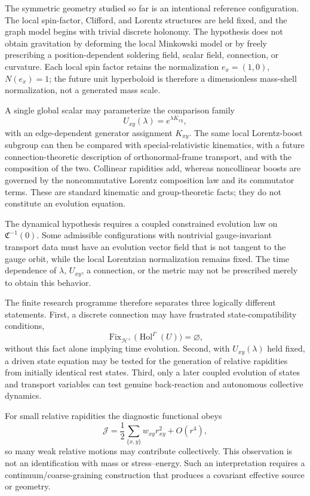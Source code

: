 \documentclass[11pt,a4paper]{article}
\theoremstyle{remark}
\newcommand{\Hol}{\operatorname{Hol}}
\begin{document}
The symmetric geometry studied so far is an intentional reference configuration.  The local spin-factor, Clifford, and Lorentz structures are held fixed, and the graph model begins with trivial discrete holonomy.  The hypothesis does not obtain gravitation by deforming the local Minkowski model or by freely prescribing a position-dependent soldering field, scalar field, connection, or curvature.  Each local spin factor retains the normalization \(e_x=(1,0)\), \(N(e_x)=1\); the future unit hyperboloid is therefore a dimensionless mass-shell normalization, not a generated mass scale.

A single global scalar may parameterize the comparison family
\[
  U_{xy}(\lambda)=e^{\lambda K_{xy}},
\]
with an edge-dependent generator assignment \(K_{xy}\).  The same local Lorentz-boost subgroup can then be compared with special-relativistic kinematics, with a future connection-theoretic description of orthonormal-frame transport, and with the composition of the two.  Collinear rapidities add, whereas noncollinear boosts are governed by the noncommutative Lorentz composition law and its commutator terms.  These are standard kinematic and group-theoretic facts; they do not constitute an evolution equation.

The dynamical hypothesis requires a coupled constrained evolution law on \(\mathfrak C^{-1}(0)\).  Some admissible configurations with nontrivial gauge-invariant transport data must have an evolution vector field that is not tangent to the gauge orbit, while the local Lorentzian normalization remains fixed.  The time dependence of \(\lambda\), \(U_{xy}\), a connection, or the metric may not be prescribed merely to obtain this behavior.

The finite research programme therefore separates three logically different statements.  First, a discrete connection may have frustrated state-compatibility conditions,
\begin{equation}
  \operatorname{Fix}_{\mathcal H^+}
  \bigl(\Hol^{\Gamma}(U)\bigr)=\varnothing,
\tag{10.5}
\end{equation}
without this fact alone implying time evolution.  Second, with \(U_{xy}(\lambda)\) held fixed, a driven state equation may be tested for the generation of relative rapidities from initially identical rest states.  Third, only a later coupled evolution of states and transport variables can test genuine back-reaction and autonomous collective dynamics.

For small relative rapidities the diagnostic functional obeys
\[
  \mathcal J
  =\frac12\sum_{\{x,y\}}w_{xy}r_{xy}^2+O(r^4),
\]
so many weak relative motions may contribute collectively.  This observation is not an identification with mass or stress--energy.  Such an interpretation requires a continuum/coarse-graining construction that produces a covariant effective source or geometry.
\end{document}
